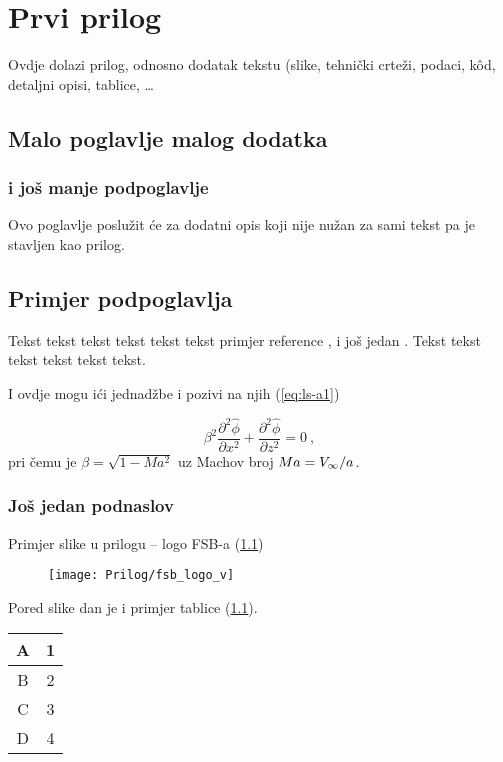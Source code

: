\chapter{Prvi prilog}
Ovdje dolazi prilog, odnosno dodatak tekstu (slike, tehnički crteži, podaci,
k\^ od, detaljni opisi, tablice, \ldots

\newpage 
\section{Malo poglavlje malog dodatka}
\subsection{i još manje podpoglavlje}
Ovo poglavlje poslu\v{z}it \'{c}e za dodatni opis koji nije nužan za sami
tekst pa je stavljen kao prilog.

\section{Primjer podpoglavlja}
Tekst tekst tekst tekst tekst tekst primjer reference
\cite{Rubio2019}, i jo\v{s} jedan \cite{cern_tim}.
Tekst tekst tekst tekst tekst tekst.

I ovdje mogu ići jednadžbe i pozivi na njih (\eqref{eq:ls-a1}) 

\begin{equation}\label{eq:ls-a1}
\beta ^2 \frac{{\partial ^2 \hat \phi }}
{{\partial x^2 }} + \frac{{\partial ^2 \hat \phi }}
{{\partial z^2 }} = 0\:,
\end{equation}
pri čemu je $\beta=\sqrt{1-Ma^2}$ uz Machov broj $Ma=\hbox{$V_{\infty}$}/a$.
%
%

\subsection{Još jedan podnaslov}
Primjer slike u prilogu -- logo FSB-a (\ref{figa1})
\begin{figure}[H]
  \centering
  \texttt{[image: Prilog/fsb\_logo\_v]}
  \label{figa1}
\end{figure}

Pored slike dan je i primjer tablice (\ref{tablicaa}).
\begin{table}[H]
  \label{tablicaa}
    \centering
  \begin{tabular}{|c|c|} \hline
      A & 1 \\\hline
      B & 2 \\\hline
      C & 3 \\\hline
      D & 4 \\ \hline
  \end{tabular}
\end{table}
